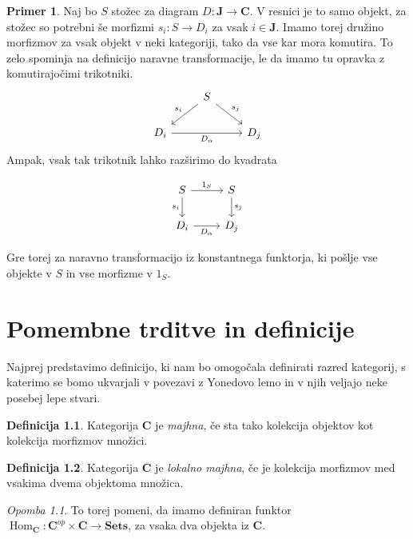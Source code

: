 \documentclass[12pt,a4paper]{book}
\theoremstyle{definition}
\newtheorem{definicija}{Definicija}[chapter]
\theoremstyle{plain}
\theoremstyle{definition}
\newtheorem{primer}{Primer}[section]
\theoremstyle{remark}
\newtheorem*{opomba}{Opomba}
\newcommand{\cat}[1]{\textbf{#1}}
\DeclareMathOperator{\Hom}{Hom}
\begin{document}
\begin{primer}
Naj bo $S$ stožec za diagram $D : \cat{J} \to \cat{C}$. V resnici je to samo objekt, za stožec so potrebni še morfizmi $s_i : S \to D_i$ za vsak $i \in \cat{J}$. Imamo torej družino morfizmov za vsak objekt v neki kategoriji, tako da vse kar mora komutira. To zelo spominja na definicijo naravne transformacije, le da imamo tu opravka z komutirajočimi trikotniki.
$$ \begin{tikzcd}
& S \ar[dl, "s_i"'] \ar[dr, "s_j"] & \\
D_i \ar[rr, "D_\alpha"'] & & D_j
\end{tikzcd} $$
Ampak, vsak tak trikotnik lahko razširimo do kvadrata

$$ \begin{tikzcd}
S \ar[d, "s_i"'] \ar[r, "1_S"] & S \ar[d, "s_j"]\\
D_i \ar[r, "D_\alpha"'] & D_j
\end{tikzcd} $$

Gre torej za naravno transformacijo iz konstantnega funktorja, ki pošlje vse objekte v $S$ in vse morfizme v $1_S$.

\end{primer}


\chapter{Pomembne trditve in definicije}

Najprej predstavimo definicijo, ki nam bo omogočala definirati razred kategorij, s katerimo se bomo ukvarjali v povezavi z Yonedovo lemo in v njih veljajo neke posebej lepe stvari.

\begin{definicija}
Kategorija $\cat{C}$ je \emph{majhna}, če sta tako kolekcija objektov kot kolekcija morfizmov množici.
\end{definicija}

\begin{definicija}
Kategorija $\cat{C}$ je \emph{lokalno majhna}, če je kolekcija morfizmov med vsakima dvema objektoma množica.
\end{definicija}
\begin{opomba}
To torej pomeni, da imamo definiran funktor $\Hom_{\cat{C}} : \cat{C}^{op} \times \cat{C} \to \cat{Sets}$, za vsaka dva objekta iz $\cat{C}$.
\end{opomba}
\end{document}
